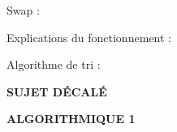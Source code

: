 \documentclass[11pt,a4paper]{article}
\newcommand{\TitreMatiere}{Algorithmique 1}
\begin{document}
\vfillFirst

\begin{center}
Swap :
\end{center}

\vfillLast

\clearpage

\vfillFirst

\begin{center}
Explications du fonctionnement :

\medskip

Algorithme de tri :
\end{center}

\vfillLast

\newpage




\vfillFirst

\begin{center}

\begin{LARGE}
\textbf{\MakeUppercase{Sujet Décalé}}

\bigskip

\textbf{\MakeUppercase{\TitreMatiere}}
\end{LARGE}

\end{center}

\vfillLast
\end{document}

